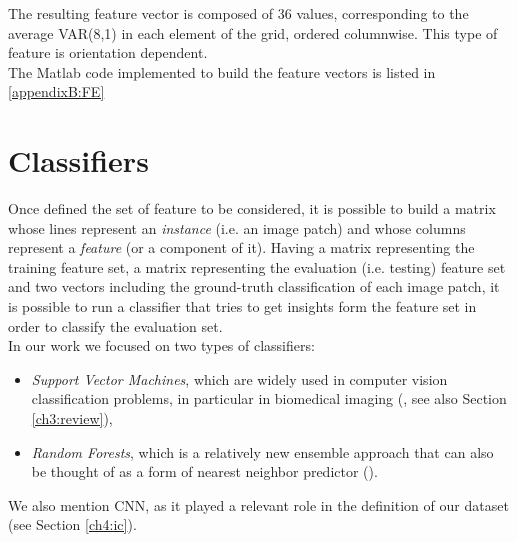 The resulting feature vector is composed of 36 values, corresponding to the average VAR(8,1) in each element of the grid, ordered columnwise. This type of feature is orientation dependent.
\\
The Matlab code implemented to build the feature vectors is listed in \ref{appendixB:FE}






\vspace{0.5cm}


\section{Classifiers}

Once defined the set of feature to be considered, it is possible to build a matrix whose lines represent an \textit{instance} (i.e. an image patch) and whose columns represent a \textit{feature}
(or a component of it). Having a matrix representing the training feature set, a matrix representing the evaluation (i.e. testing) feature set and two vectors including the ground-truth
classification of each image patch, it is possible to run a classifier that tries to get insights form the feature set in order to classify the evaluation set.\\
In our work we focused on two types of classifiers:

\begin{itemize}
 \item \textit{Support Vector Machines}, which are widely used in computer vision classification problems, in particular
in biomedical imaging (\cite{mitosisDetectionLearningBased, SVM02, SVM03, SVMClassHistogram}, see also Section \ref{ch3:review}),
 \item \textit{Random Forests}, which is a relatively new ensemble approach that can also be thought of as a form of nearest neighbor predictor (\cite{randForests03,randForests02,randForests04}).
\end{itemize}

We also mention \Gls{CNN}, as it played a relevant role in the definition of our dataset (see Section \ref{ch4:ic}).


